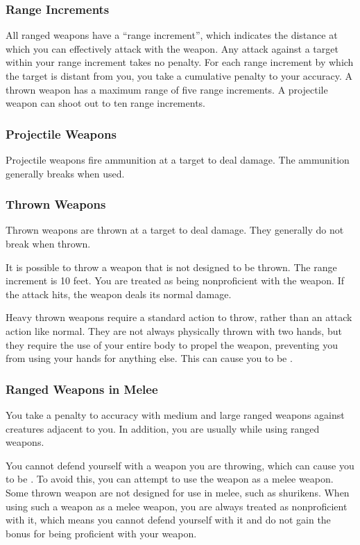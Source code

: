 \subsubsection{Range Increments}\label{Range Increment} All ranged weapons have a ``range increment'', which indicates the distance at which you can effectively attack with the weapon. Any attack against a target within your range increment takes no penalty. For each range increment by which the target is distant from you, you take a cumulative  penalty to your accuracy. A thrown weapon has a maximum range of five range increments. A projectile weapon can shoot out to ten range increments.

\subsubsection{Projectile Weapons} Projectile weapons fire ammunition at a target to deal damage. The ammunition generally breaks when used.

\subsubsection{Thrown Weapons}\label{Thrown Weapons} Thrown weapons are thrown at a target to deal damage. They generally do not break when thrown.

 It is possible to throw a weapon that is not designed to be thrown. The range increment is 10 feet. You are treated as being nonproficient with the weapon. If the attack hits, the weapon deals its normal damage.

 Heavy thrown weapons require a standard action to throw, rather than an attack action like normal. They are not always physically thrown with two hands, but they require the use of your entire body to propel the weapon, preventing you from using your hands for anything else. This can cause you to be .

\subsubsection{Ranged Weapons in Melee}

You take a  penalty to accuracy with medium and large ranged weapons against creatures adjacent to you. In addition, you are usually  while using ranged weapons.

\label{Thrown Weapons in Melee} You cannot defend yourself with a weapon you are throwing, which can cause you to be . To avoid this, you can attempt to use the weapon as a melee weapon. Some thrown weapon are not designed for use in melee, such as shurikens. When using such a weapon as a melee weapon, you are always treated as nonproficient with it, which means you cannot defend yourself with it and do not gain the  bonus for being proficient with your weapon.

